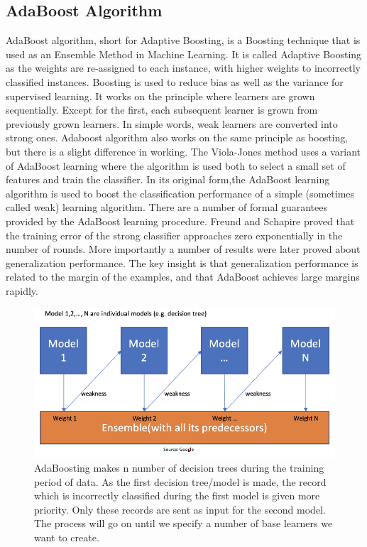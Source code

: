 \documentclass[12pt,a4paper]{article}
\begin{document}
\subsection{AdaBoost Algorithm}
AdaBoost algorithm, short for Adaptive Boosting, is a Boosting technique that is used as an Ensemble Method in Machine Learning. It is called Adaptive Boosting as the weights are re-assigned to each instance, with higher weights to incorrectly classified instances. Boosting is used to reduce bias as well as the variance for supervised learning. It works on the principle where learners are grown sequentially. Except for the first, each subsequent learner is grown from previously grown learners. In simple words, weak learners are converted into strong ones. Adaboost algorithm also works on the same principle as boosting, but there is a slight difference in working.
The Viola-Jones method uses a variant of AdaBoost learning where the algorithm is used both to select a small set of features and train the classifier. In its original form,the AdaBoost learning algorithm is used to boost the classification performance of a simple (sometimes called weak) learning algorithm. There are a number of formal guarantees provided by the AdaBoost learning procedure. Freund and Schapire proved that the training error of the strong classifier approaches zero exponentially in the number of
rounds. More importantly a number of results were later proved about generalization performance. The key insight is that generalization performance is related to the margin of the examples, and that AdaBoost achieves large margins rapidly.
\begin{figure}[ht!]
\centerline{\includegraphics[scale=0.5]{Ada_boost.png}}
\caption{ AdaBoosting makes n number of decision trees during the training period of data. As the first decision tree/model is made, the record which is incorrectly classified during the first model is given more priority. Only these records are sent as input for the second model. The process will go on until we specify a number of base learners we want to create.}
\label{fig 4}
\end{figure}
\end{document}
